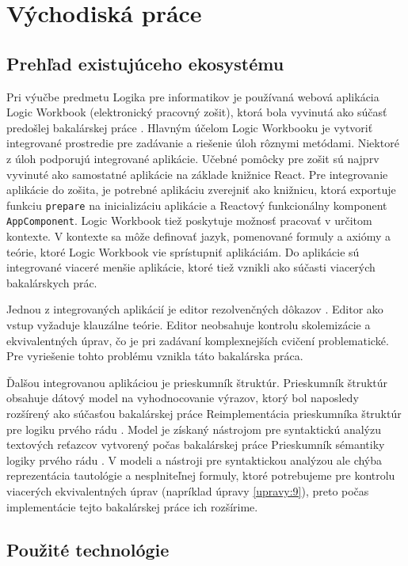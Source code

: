 \chapter{Východiská práce}


\section{Prehľad existujúceho ekosystému}

Pri výučbe predmetu Logika pre informatikov je používaná webová aplikácia Logic Workbook (elektronický pracovný zošit), ktorá bola vyvinutá ako súčasť predošlej bakalárskej práce \cite{logicworkbook}. Hlavným účelom Logic Workbooku je vytvoriť integrované prostredie pre zadávanie a riešenie úloh rôznymi metódami. Niektoré z úloh podporujú integrované aplikácie. 
	Učebné pomôcky pre zošit sú najprv vyvinuté ako samostatné aplikácie na základe knižnice React. Pre integrovanie aplikácie do zošita, je potrebné aplikáciu zverejniť ako knižnicu, ktorá exportuje funkciu \texttt{prepare} na inicializáciu aplikácie a Reactový funkcionálny komponent \texttt{AppComponent}. 
Logic Workbook tiež poskytuje možnosť pracovať v určitom kontexte. V kontexte sa môže definovať jazyk, pomenované formuly a axiómy a teórie, ktoré Logic Workbook vie sprístupniť aplikáciám. Do aplikácie sú integrované viaceré menšie aplikácie, ktoré tiež vznikli ako súčasti viacerých bakalárskych prác. 

Jednou z integrovaných aplikácií je editor rezolvenčných dôkazov \cite{rezolvovac}. Editor ako vstup vyžaduje klauzálne teórie. Editor neobsahuje kontrolu skolemizácie a ekvivalentných úprav, čo je pri zadávaní komplexnejších cvičení problematické. Pre vyriešenie tohto problému vznikla táto bakalárska práca.

Ďalšou integrovanou aplikáciou je prieskumník štruktúr. Prieskumník štruktúr obsahuje dátový model na vyhodnocovanie výrazov, ktorý bol naposledy rozšírený ako súčasťou bakalárskej práce Reimplementácia prieskumníka štruktúr pre logiku prvého rádu \cite{structureexplorer}. 
	Model je získaný nástrojom pre syntaktickú analýzu textových reťazcov vytvorený počas bakalárskej práce Prieskumník sémantiky logiky prvého rádu \cite{explorercifra}. V modeli a nástroji pre syntaktickou analýzou ale chýba reprezentácia tautológie a nesplniteľnej formuly, ktoré potrebujeme pre kontrolu viacerých ekvivalentných úprav (napríklad úpravy \eqref{upravy:9}), preto počas implementácie tejto bakalárskej práce ich rozšírime.

\section{Použité technológie}

